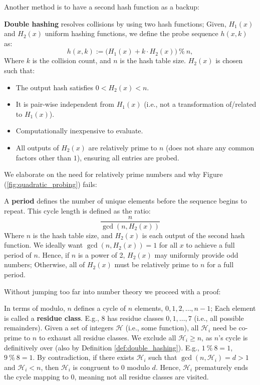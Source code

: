 \newpage 

\noindent
Another method is to have a second hash function as a backup:

\begin{Def}

  \label{def:double_hashing}
  \textbf{Double hashing} resolves collisions by using two hash functions; Given, $H_1(x)$ and $H_2(x)$ uniform hashing functions,
  we define the probe sequence $h(x,k)$ as:
  \[
    h(x,k) := \bigl(H_1(x) + k \cdot H_2(x)\bigr)\ \%\ n,
  \]
  Where $k$ is the collision count, and $n$ is the hash table size.
  $H_2(x)$ is chosen such that:
  \begin{itemize}
    \item The output hash satisfies $0 < H_2(x) < n$.
    \item It is pair-wise independent from $H_1(x)$ (i.e., not a transformation of/related to $H_1(x)$).
    \item Computationally inexpensive to evaluate.
    \item All outputs of $H_2(x)$ are relatively prime to $n$ (does not share any common factors other than $1$), ensuring all entries are probed.
  \end{itemize}
\end{Def}

\noindent 
We elaborate on the need for relatively prime numbers and why Figure (\ref{fig:quadratic_probing}) fails:
\begin{theo}
 
    \label{thm:probes_period}
    A \textbf{period} defines the number of unique elements before the sequence begins to repeat. This cycle length is defined as the ratio:
    \[ \dfrac{n}{\gcd(n, H_2(x))} \]
    Where $n$ is the hash table size, and $H_2(x)$ is each output of the second hash function. We ideally want $\gcd(n, H_2(x))=1$ 
    for all $x$ to achieve a full period of $n$. Hence, if $n$ is a power of 2,
    $H_2(x)$ may uniformly provide odd numbers; Otherwise, all of $H_2(x)$ must be relatively prime to $n$ for a full period.
\end{theo}

\noindent
Without jumping too far into number theory we proceed with a proof:
\begin{Proof}

    \label{proof:probes_period}
    In terms of modulo, $n$ defines a cycle of $n$ elements, $0, 1, 2, \ldots, n-1$; Each element is called a \textbf{residue class}.
    E.g., 8 has residue classes $0, 1,\dots, 7$ (i.e., all possible remainders). Given a set of integers $\mathcal{H}$ (i.e., some function),
    all $\mathcal{H}_i$ need be co-prime to $n$ to exhaust all residue classes. We exclude all $\mathcal{H}_i \geq n$, as $n$'s cycle is definitively
    over (also by Definition \ref{def:double_hashing}). E.g., $1\ \%\ 8 = 1$, $9\ \%\ 8 = 1$. By contradiction, if there exists $\mathcal{H}_i$ such that $\gcd(n, \mathcal{H}_i) = d > 1$
    and $\mathcal{H}_i < n$, then $\mathcal{H}_i$ is congruent to 0 modulo $d$. Hence, $\mathcal{H}_i$ prematurely ends the cycle mapping to 0, meaning not all residue classes are visited.
\end{Proof}

